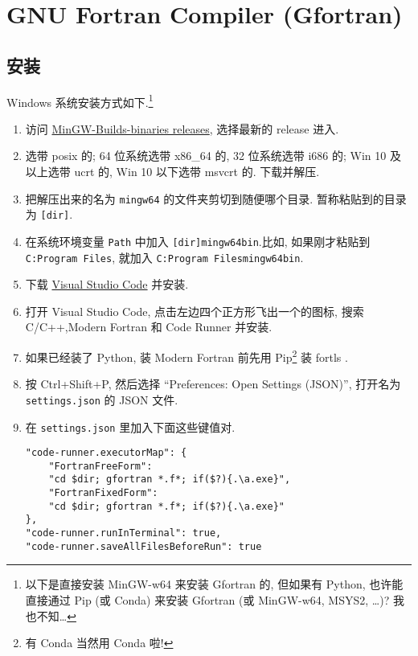 \section[GNU Fortran Compiler]{GNU Fortran Compiler (Gfortran)}

\subsection{安装}

Windows 系统安装方式如下.\footnote{
    以下是直接安装 MinGW-w64 来安装 Gfortran 的, 但如果有 Python, 也许能直接通过 Pip (或 Conda) 来安装 Gfortran (或 MinGW-w64, MSYS2, \dots)? 我也不知\dots
}
\begin{enumerate}
    \item 访问 \href{https://github.com/niXman/mingw-builds-binaries/releases}
    {MinGW-Builds-binaries releases}, 选择最新的 release 进入.
    \item 选带 posix 的; 64 位系统选带 x86\_{}64 的, 32 位系统选带 i686 的; Win 10 及以上选带 ucrt 的, Win 10 以下选带 msvcrt 的. 下载并解压.
    \item 把解压出来的名为 \texttt{mingw64} 的文件夹剪切到随便哪个目录. 暂称粘贴到的目录为 \texttt{[dir]}.
    \item 在系统环境变量 \texttt{Path} 中加入 \texttt{[dir]\bs{}mingw64\bs{}bin}.比如, 如果刚才粘贴到 \texttt{C:\bs{}Program Files}, 就加入 \texttt{C:\bs{}Program Files\bs{}mingw64\bs{}bin}.
    \item 下载 \href{https://code.visualstudio.com/sha/download?build=stable&os=win32-x64-user}{Visual Studio Code} 并安装.
    \item 打开 Visual Studio Code, 点击左边四个正方形飞出一个的图标, 搜索 C/C++,Modern Fortran 和 Code Runner 并安装.
    \item[] 如果已经装了 Python, 装 Modern Fortran 前先用 Pip\footnote{有 Conda 当然用 Conda 啦!} 装 fortls .
    \item 按 Ctrl+Shift+P, 然后选择 ``Preferences: Open Settings (JSON)'', 打开名为 \texttt{settings.json} 的 JSON 文件.
    \item 在 \texttt{settings.json} 里加入下面这些键值对.\label{add_key_value}
    \begin{verbatim}
"code-runner.executorMap": {
    "FortranFreeForm":
    "cd $dir; gfortran *.f*; if($?){.\a.exe}",
    "FortranFixedForm":
    "cd $dir; gfortran *.f*; if($?){.\a.exe}"
},
"code-runner.runInTerminal": true,
"code-runner.saveAllFilesBeforeRun": true
    \end{verbatim}
\end{enumerate}
